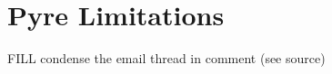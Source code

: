 \documentclass[english,cleveref,submission]{programming}
\begin{document}
{\sloppy
\printbibliography
}

\appendix

\section{Pyre Limitations}

FILL condense the email thread in comment (see source)

\end{document}
